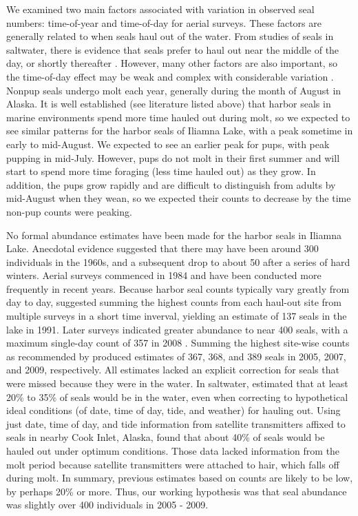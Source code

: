 \documentclass[]{risa}\usepackage[]{graphicx}\usepackage[]{color}
\begin{document}
We examined two main factors associated with variation in observed seal numbers: time-of-year and time-of-day for aerial surveys.  These factors are generally related to when seals haul out of the water.  From studies of seals in saltwater, there is evidence that seals prefer to haul out near the middle of the day, or shortly thereafter \citep{Bove:Beng:With:Cesa:Simp:Fros:Burn:abun:2003,Simp:With:Cesa:Bove:stab:2003,Math:Pend:decl:2006,Ver:Lond:Bove:fast:2010}. However, many other factors are also important, so the time-of-day effect may be weak and complex with considerable variation \citep{Ver:Fros:baye:2003, Lond:VerH:Jeff:Lanc:Bove:haul:2012}.  Nonpup seals undergo molt each year, generally during the month of August in Alaska. It is well established (see literature listed above) that harbor seals in marine environments spend more time hauled out during molt, so we expected to see similar patterns for the harbor seals of Iliamna Lake, with a peak sometime in early to mid-August. We expected to see an earlier peak for pups, with peak pupping in mid-July. However, pups do not molt in their first summer and will start to spend more time foraging (less time hauled out) as they grow.  In addition, the pups grow rapidly and are difficult to distinguish from adults by mid-August when they wean, so we expected their counts to decrease by the time non-pup counts were peaking.

No formal abundance estimates have been made for the harbor seals in Iliamna Lake.  Anecdotal evidence \citep{Burn:unpu:1978} suggested that there may have been around 300 individuals in the 1960s, and a subsequent drop to about 50 after a series of hard winters.  Aerial surveys commenced in 1984 and have been conducted more frequently in recent years. Because harbor seal counts typically vary greatly from day to day, \citet{Math:Klin:harb:1992} suggested summing the highest counts from each haul-out site from multiple surveys in a short time inverval, yielding an estimate of 137 seals in the lake in 1991. Later surveys indicated greater abundance to near 400 seals, with a maximum single-day count of 357 in 2008 \citep{ABR:wild:2011}. Summing the highest site-wise counts as recommended by \citet{Math:Klin:harb:1992} produced estimates of 367, 368, and 389 seals in 2005, 2007, and 2009, respectively.  All estimates lacked an explicit correction for seals that were missed because they were in the water. In saltwater, \citet{Simp:With:Cesa:Bove:stab:2003} estimated that at least 20\% to 35\% of seals would be in the water, even when correcting to hypothetical ideal conditions (of date, time of day, tide, and weather) for hauling out. Using just date, time of day, and tide information from satellite transmitters affixed to seals in nearby Cook Inlet, Alaska, \citet{Ver:Lond:Bove:fast:2010} found that about 40\% of seals would be hauled out under optimum conditions. Those data lacked information from the molt period because satellite transmitters were attached to hair, which falls off during molt.  In summary, previous estimates based on counts are likely to be low, by perhaps 20\% or more.  Thus, our working hypothesis was that seal abundance was slightly over 400 individuals in 2005 - 2009.
\end{document}
